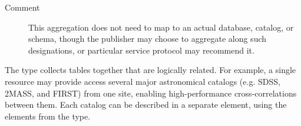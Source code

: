 \documentclass[11pt,a4paper]{ivoa}
\begin{document}
\begin{generated}
\begin{bigdescription}
\begin{description}
\item[Comment] 
                This aggregation does not need to map to an
                actual database, catalog, or schema, though the
                publisher may choose to aggregate along such
                designations, or particular service protocol may
                recommend it.  
              

\end{description}


\end{bigdescription}\endgroup

\endgroup
\end{generated}



The  type collects
tables together that are logically related.
For example, a single
resource may provide access several major astronomical catalogs
(e.g. SDSS, 2MASS, and FIRST) from one site, enabling high-performance
cross-correlations between them.  Each catalog can be described in a
separate  element, using the elements from
the  type.
\end{document}
